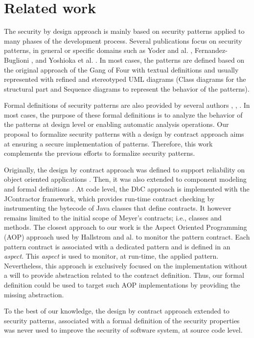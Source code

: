 
\section{Related work}

The security by design approach is mainly based on security patterns applied to many phases of the development process. Several publications focus on security patterns, in general or specific domains such as Yoder and al. \cite{yoder1997}, Fernandez-Buglioni \cite{fernandez2013}, and Yoshioka et al. \cite{yoshioka2008}. In most cases, the patterns are defined based on the original approach of the Gang of Four \cite{gamma1995} with textual definitions and usually represented with refined and stereotyped UML diagrams (Class diagrams for the structural part and Sequence diagrams to represent the behavior of the patterns).

Formal definitions of security patterns are also provided by several authors \cite{cheng2019}, \cite{behrens2018}, \cite{daSilva2013}. In most cases, the purpose of these formal definitions is to analyze the behavior of the patterns at design level or enabling automatic analysis operations. Our proposal to formalize security patterns with a design by contract approach aims at ensuring a secure implementation of patterns. Therefore, this work complements the previous efforts to formalize security patterns.

Originally, the design by contract approach was defined to support reliability on object oriented applications \cite{meyer1992applying}. Then, it was also extended to component modeling \cite{beugnard1999} and formal definitions \cite{mouelhi2019}. 
At code level, the DbC approach is implemented with the JContractor \cite{karaorman2005} framework, which provides run-time contract checking by instrumenting the bytecode of Java classes that define contracts. It however remains limited to the initial scope of Meyer's contracts; i.e., classes and methods. The closest approach to our work is the Aspect Oriented Programming (AOP) approach used by Hallstrom and al. \cite{hallstrom2004} to monitor the pattern contract.
Each pattern contract is associated with a dedicated pattern and is defined in an \emph{aspect}. This \emph{aspect} is used to monitor, at run-time, the applied pattern. Nevertheless, this approach is exclusively focused on the implementation without a will to provide abstraction related to the contract definition. Thus, our formal definition could be used to target such AOP implementations by providing the missing abstraction. 

To the best of our knowledge, the design by contract approach extended to security patterns, associated with a formal definition of the security properties was never used to improve the security of software system, at source code level.




